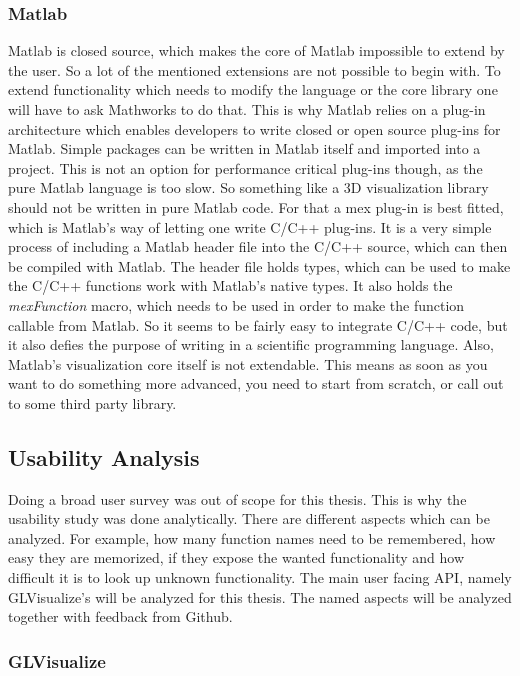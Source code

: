 {\subsubsection{Matlab}

Matlab is closed source, which makes the core of Matlab impossible to extend by the user. So a lot of the mentioned extensions are not possible to begin with. 
To extend functionality which needs to modify the language or the core library one will have to ask Mathworks to do that.
This is why Matlab relies on a plug-in architecture which enables developers to write closed or open source plug-ins for Matlab. 
Simple packages can be written in Matlab itself and imported into a project.
This is not an option for performance critical plug-ins though, as the pure Matlab language is too slow.
So something like a 3D visualization library should not be written in pure Matlab code.
For that a mex plug-in is best fitted, which is Matlab's way of letting one write C/C++ plug-ins.
It is a very simple process of including a Matlab header file into the C/C++ source, which can then be compiled with Matlab.
The header file holds types, which can be used to make the C/C++ functions work with Matlab's native types.
It also holds the \textit{mexFunction} macro, which needs to be used in order to make the function callable from Matlab.
So it seems to be fairly easy to integrate C/C++ code, but it also defies the purpose of writing in a scientific programming language.
Also, Matlab's visualization core itself is not extendable. This means as soon as you want to do something more advanced, you need to start from scratch, or call out to some third party library.


\subsection{Usability Analysis}
Doing a broad user survey was out of scope for this thesis.
This is why the usability study was done analytically.
There are different aspects which can be analyzed. For example, how many function names need to be remembered, how easy they are memorized, if they expose the wanted functionality and how difficult it is to look up unknown functionality.
The main user facing \ac{API}, namely GLVisualize’s will be analyzed for this thesis. 
The named aspects will be analyzed together with feedback from Github.

\subsubsection{GLVisualize}

}
